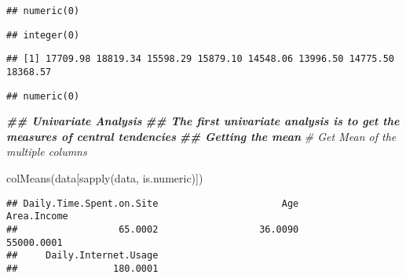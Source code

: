 \documentclass[
]{article}
\newenvironment{Shaded}{\begin{snugshade}}{\end{snugshade}}
\newcommand{\CommentTok}[1]{\textcolor[rgb]{0.56,0.35,0.01}{\textit{#1}}}
\newcommand{\DocumentationTok}[1]{\textcolor[rgb]{0.56,0.35,0.01}{\textbf{\textit{#1}}}}
\newcommand{\FunctionTok}[1]{\textcolor[rgb]{0.00,0.00,0.00}{#1}}
\newcommand{\NormalTok}[1]{#1}
\newcommand{\SpecialCharTok}[1]{\textcolor[rgb]{0.00,0.00,0.00}{#1}}
\begin{document}
\begin{verbatim}
## numeric(0)
\end{verbatim}

\begin{Shaded}
\end{Shaded}

\begin{verbatim}
## integer(0)
\end{verbatim}

\begin{Shaded}
\end{Shaded}

\begin{verbatim}
## [1] 17709.98 18819.34 15598.29 15879.10 14548.06 13996.50 14775.50 18368.57
\end{verbatim}

\begin{Shaded}
\end{Shaded}

\begin{verbatim}
## numeric(0)
\end{verbatim}

\begin{Shaded}
\begin{Highlighting}[]
\DocumentationTok{\#\# Univariate Analysis}
\DocumentationTok{\#\# The first univariate analysis is to get the measures of central tendencies}
\DocumentationTok{\#\# Getting the mean}
\CommentTok{\# Get Mean of the multiple columns}
 
\FunctionTok{colMeans}\NormalTok{(data[}\FunctionTok{sapply}\NormalTok{(data, is.numeric)])}
\end{Highlighting}
\end{Shaded}

\begin{verbatim}
## Daily.Time.Spent.on.Site                      Age              Area.Income 
##                  65.0002                  36.0090               55000.0001 
##     Daily.Internet.Usage 
##                 180.0001
\end{verbatim}
\end{document}
